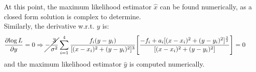 At this point, the maximum likelihood estimator \(\hat{x}\) can be found
numerically, as a closed form solution is complex to determine. \\
Similarly, the derivative w.r.t. \(y\) is:
\begin{align*}
    \frac{\partial{\log{L}}}{\partial{y}}
    =
    0
    &\Rightarrow
    \cancel{-\frac{3}{\sigma^2}}\sum_{i=1}^{4} \frac{f_i (y-y_i)}{[(x-x_i)^2+(y-y_i)^2]^3} \Biggl[\frac{-f_i + a_i[(x-x_i)^2+(y-y_i)^2]^\frac{3}{2}}{[(x-x_i)^2+(y-y_i)^2]}\Biggr]
    =
    0
\end{align*}
and the maximum likelihood estimator \(\hat{y}\) is computed numerically.